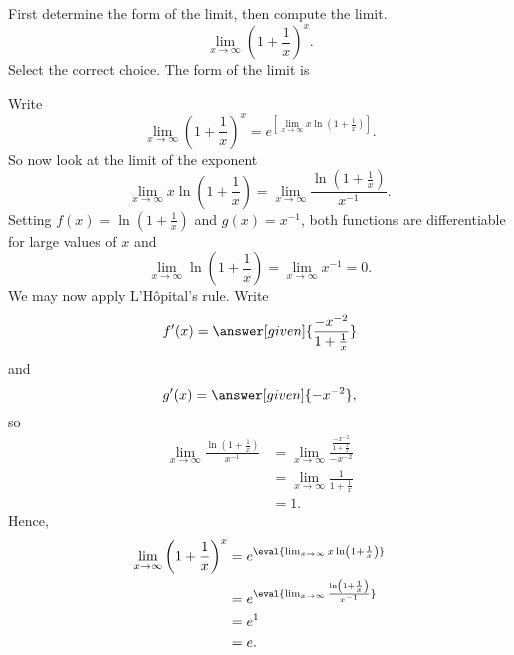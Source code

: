 \documentclass{ximera}
\begin{document}
\begin{example}
First determine the form of the limit, then compute the limit.
\[
\lim_{x\to \infty}\left(1 + \frac{1}{x}\right)^x.
\]
  Select the correct choice. The form of the limit is
 \begin{multipleChoice}
     \choice{$\zeroOverZero$}
 \choice{ \inftyOverInfty}
 \choice{$\zeroTimesInfty$}
 \choice{ \inftyMinusInfty}
  \choice[correct] {$\oneToInfty$}
   \choice{$ \inftyToZero$}
   \choice{$\zeroToZero$}
  \end{multipleChoice}
\begin{explanation}
Write
\[
\lim_{x\to \infty}\left(1 + \frac{1}{x}\right)^x = e^{\left[\lim_{x\to \infty}x\ln\left(1 + \frac{1}{x}\right)\right]}.
\]
So now look at the limit of the exponent
\[
\lim_{x\to\infty} x\ln\left(1 + \frac{1}{x}\right) = \lim_{x\to\infty} \frac{\ln\left(1 + \frac{1}{x}\right)}{x^{-1}}.
\]
Setting $f(x) = \ln\left(1 + \frac{1}{x}\right)$ and $g(x) = x^{-1}$,
both functions are differentiable for large values of $x$ and
\[
\lim_{x\to \infty}\ln\left(1 + \frac{1}{x}\right)=\lim_{x\to \infty}x^{-1} = 0.
\]
We may now apply L'H\^{o}pital's rule. Write
\[
f'(x) = \answer[given]{\frac{-x^{-2}}{1 + \frac{1}{x}}}
\]
and
\[
g'(x) = \answer[given]{-x^{-2}},
\]
so
\begin{align*}
\lim_{x\to\infty} \frac{\ln\left(1 + \frac{1}{x}\right)}{x^{-1}} &= \lim_{x\to\infty} \frac{\frac{-x^{-2}}{1 + \frac{1}{x}}}{-x^{-2}} \\
&=\lim_{x\to\infty} \frac{1}{1 + \frac{1}{x}}\\
&=1.
\end{align*}
Hence, 
\begin{align*}
  \lim_{x\to \infty}\left(1 + \frac{1}{x}\right)^x &=e^{ \eval{\lim_{x\to \infty}x\ln\left(1 + \frac{1}{x}\right)}} \\
  &=e^{ \eval{\lim_{x\to\infty} \frac{\ln\left(1 + \frac{1}{x}\right)}{x^{-1}}}} \\
  &=e^{1} \\
  &= e.
\end{align*}
\end{explanation}
\end{example}
\end{document}
